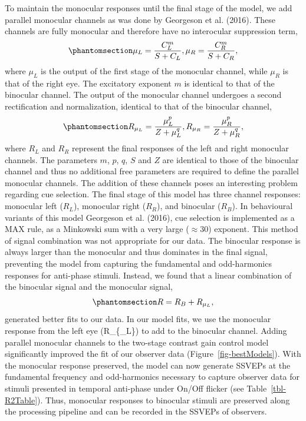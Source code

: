 \documentclass[
  12pt,
]{article}
\begin{document}
To maintain the monocular responses until the final stage of the model,
we add parallel monocular channels as was done by Georgeson et al.
(2016). These channels are fully monocular and therefore have no
interocular suppression term,
\begin{equation}\phantomsection\label{eq-monocFirstStage}{
\mu_L = \frac{C_L^m}{S + C_L},\mu_R = \frac{C_R^m}{S + C_R},
}\end{equation} where \(\mu_L\) is the output of the first stage of the
monocular channel, while \(\mu_R\) is that of the right eye. The
excitatory exponent \(m\) is identical to that of the binocular channel.
The output of the monocular channel undergoes a second rectification and
normalization, identical to that of the binocular channel,
\begin{equation}\phantomsection\label{eq-monocSecondStage}{
R_{\mu_L} = \frac{\mu_L^p}{Z + \mu_L^q},R_{\mu_R} = \frac{\mu_R^p}{Z + \mu_R^q},
}\end{equation} where \(R_L\) and \(R_R\) represent the final responses
of the left and right monocular channels. The parameters \(m\), \(p\),
\(q\), \(S\) and \(Z\) are identical to those of the binocular channel
and thus no additional free parameters are required to define the
parallel monocular channels. The addition of these channels poses an
interesting problem regarding cue selection. The final stage of this
model has three channel responses: monocular left (\(R_L\)), monocular
right (\(R_R\)), and binocular (\(R_B\)). In behavioural variants of
this model Georgeson et al. (2016), cue selection is implemented as a
MAX rule, as a Minkowski sum with a very large (\(\approx 30\))
exponent. This method of signal combination was not appropriate for our
data. The binocular response is always larger than the monocular and
thus dominates in the final signal, preventing the model from capturing
the fundamental and odd-harmonics responses for anti-phase stimuli.
Instead, we found that a linear combination of the binocular signal and
the monocular signal,
\begin{equation}\phantomsection\label{eq-binocMonocComb}{  
R=R_B+R_{\mu_L},
}\end{equation} generated better fits to our data. In our model fits, we
use the monocular response from the left eye (R\_\{\mu\_L\}) to add to
the binocular channel. Adding parallel monocular channels to the
two-stage contrast gain control model significantly improved the fit of
our observer data (Figure~\ref{fig-bestModels}). With the monocular
response preserved, the model can now generate SSVEPs at the fundamental
frequency and odd-harmonics necessary to capture observer data for
stimuli presented in temporal anti-phase under On/Off flicker (see
Table~\ref{tbl-R2Table}). Thus, monocular responses to binocular stimuli
are preserved along the processing pipeline and can be recorded in the
SSVEPs of observers.
\end{document}
